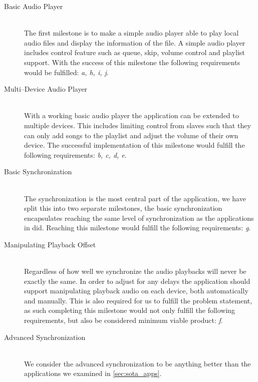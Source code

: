 \begin{description}
    \item [Basic Audio Player] \hfill \\
        The first milestone is to make a simple audio player able to play local audio files and display the information of the file.
        A simple audio player includes control feature such as queue, skip, volume control and playlist support.
        With the success of this milestone the following requirements would be fulfilled: \textit{a, h, i, j}.
    \item [Multi--Device Audio Player] \hfill \\
        With a working basic audio player the application can be extended to multiple devices.
        This includes limiting control from slaves such that they can only add songs to the playlist and adjust the volume of their own device.
        The successful implementation of this milestone would fulfill the following requirements: \textit{b, c, d, e}.
    \item [Basic Synchronization] \hfill \\
        The synchronization is the most central part of the application, we have split this into two separate milestones, the basic synchronization encapsulates reaching the same level of synchronization as the applications in  did.
        Reaching this milestone would fulfill the following requirements: \textit{g}.
    \item [Manipulating Playback Offset] \hfill \\ %
        Regardless of how well we synchronize the audio playbacks will never be exactly the same.
        In order to adjust for any delays the application should support manipulating playback audio on each device, both automatically and manually.
        This is also required for us to fulfill the problem statement, as such completing this milestone would not only fulfill the following requirements, but also be considered minimum viable product: \textit{f}.
    \item [Advanced Synchronization] \hfill \\
        We consider the advanced synchronization to be anything better than the applications we examined in \cref{sec:sota_apps}.

\end{description}
